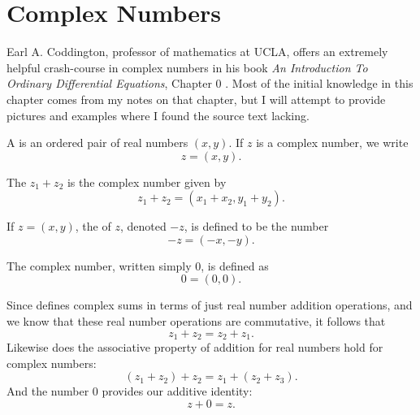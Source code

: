 \chapter{Complex Numbers}\label{ch:complex}
Earl A. Coddington, professor of mathematics at UCLA, offers an extremely helpful crash-course in complex numbers in his book \emph{An Introduction To Ordinary Differential Equations}, Chapter 0 \cite{coddington}.
Most of the initial knowledge in this chapter comes from my notes on that chapter, but I will attempt to provide pictures and examples where I found the source text lacking.
\begin{defn}
  A  is an ordered pair of real numbers $(x, y)$.
  If $z$ is a complex number, we write
  \begin{equation}
    z = (x,y).
  \end{equation}
\end{defn}
\begin{defn}
  The  $z_1+z_2$ is the complex number given by
  \begin{equation}
    z_1 + z_2 = (x_1 + x_2, y_1 + y_2).
    \label{eq:complexsum}
  \end{equation}
\end{defn}
\begin{defn}
  If $z=(x,y)$, the  of $z$, denoted $-z$, is defined to be the number
  \begin{equation}
    -z = (-x, -y).
  \end{equation}
\end{defn}
\begin{defn}
  The  complex number, written simply 0, is defined as
  \begin{equation}
    0 = (0, 0).
  \end{equation}
\end{defn}
Since  defines complex sums in terms of just real number addition operations, and we know that these real number operations are commutative, it follows that
\begin{equation}
  z_1+z_2 = z_2 + z_1.
\end{equation}
Likewise does the associative property of addition for real numbers hold for complex numbers:
\begin{equation}
  (z_1 + z_2) + z_2 = z_1 + (z_2 + z_3).
\end{equation}
And the number $0$ provides our additive identity:
\begin{equation}
  z + 0 = z.
\end{equation}
